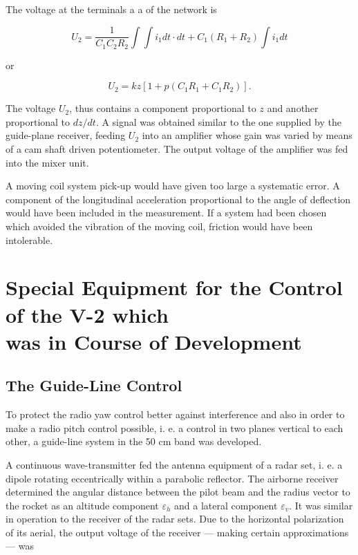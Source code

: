 \documentclass[12pt, a4paper]{article}
\begin{document}
The voltage at the terminals a a of the network is

\begin{equation}
  U_{2}=\frac{1}{C_{1}C_{2}R_{2}}\int\int i_{1}dt\cdot dt+C_{1}(R_{1}+R_{2})\int i_{1}dt
\end{equation}

or

\begin{equation}
  U_{2}=kz\left[1+p(C_{1}R_{1}+C_{1}R_{2})\right]  .
\end{equation}

The voltage $U_{2}$, thus contains a component proportional to $z$ and another proportional to $dz/dt$. A signal was obtained similar to the one supplied by the guide-plane receiver, feeding $U_{2}$ into an amplifier whose gain was varied by means of a cam shaft driven potentiometer. The output voltage of the amplifier was fed into the mixer unit.

A moving coil system pick-up would have given too large a systematic error. A component of the longitudinal acceleration proportional to the angle of deflection would have been included in the measurement. If a system had been chosen which avoided the vibration of the moving coil, friction would have been intolerable.

\section[Special Equipment for the Control of the V-2 which was in Course of Development]{Special Equipment for the Control of the V-2 which\\was in Course of Development}

\subsection{The Guide-Line Control}

To protect the radio yaw control better against interference and also in order to make a radio pitch control possible, i. e. a control in two planes vertical to each other, a guide-line system in the 50 cm band was developed.

A continuous wave-transmitter fed the antenna equipment of a radar set, i. e.
a dipole rotating eccentrically within a parabolic reflector. The airborne
receiver determined the angular distance between the pilot beam and the radius
vector to the rocket as an altitude component $\varepsilon_{h}$ and a lateral component $\varepsilon_{v}$. It was similar in operation to the receiver of the radar sets. Due to the horizontal polarization of its aerial, the output voltage of the receiver — making certain approximations — was
\end{document}
